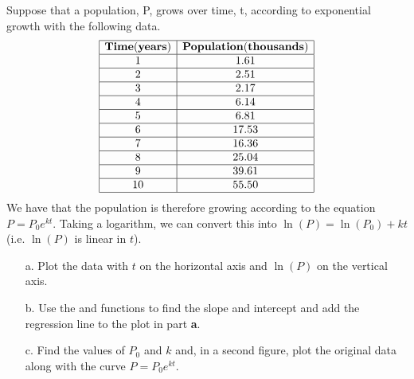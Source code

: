 {Suppose that a population, P, grows over time, t, according to exponential growth with the following data.
\[
\begin{array}{|c|c|}
\hline
{\bf Time (years) } & {\bf Population (thousands)} \\ \hline
1&	1.61\\ \hline
2&	2.51\\ \hline
3&	2.17\\ \hline
4&	6.14\\ \hline
5&	6.81\\ \hline
6&	17.53\\ \hline
7&  16.36\\ \hline
8&  25.04\\ \hline
9&  39.61\\ \hline
10 &  55.50\\ 
\hline
\end{array}
\]
We have that the population is therefore growing according to the equation $P = P_0 e^{kt}$.  Taking a logarithm, we can convert this into $\ln(P) = \ln(P_0) + kt$ (i.e. $\ln(P)$ is linear in $t$).
\begin{enumerate}
\item[a.] Plot the data with $t$ on the horizontal axis and $\ln(P)$ on the vertical axis.
\item[b.] Use the  and  functions to find the slope and intercept and add the regression line to the plot in part {\bf a}.
\item[c.] Find the values of $P_0$ and $k$ and, in a second figure, plot the original data along with the curve $P = P_0 e^{kt}$.
\end{enumerate}}
{}